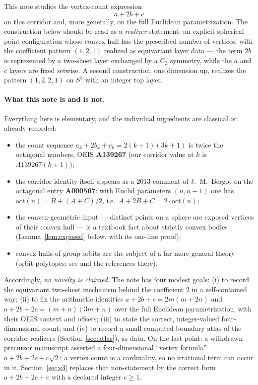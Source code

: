 \documentclass[11pt]{article}
\theoremstyle{definition}
\theoremstyle{remark}
\newcommand{\Ctwo}{C_2}
\begin{document}
This note studies the vertex-count expression
\[
a+2b+c
\]
on this corridor and, more generally, on the full Euclidean parametrization.
The construction below should be read as a \emph{realizer} statement: an
explicit spherical point configuration whose convex hull has the prescribed
number of vertices, with the coefficient pattern $(1,2,1)$ realized as
equivariant layer data --- the term $2b$ is represented by a two-sheet layer
exchanged by a $\Ctwo$ symmetry, while the $a$ and $c$ layers are fixed
setwise. A second construction, one dimension up, realizes the pattern
$(1,2,2,1)$ on $S^3$ with an integer top layer.

\paragraph{What this note is and is not.}
Everything here is elementary, and the individual ingredients are classical
or already recorded:

\begin{itemize}
\item the count sequence $a_k+2b_k+c_k = 2(k+1)(3k+1)$ is twice the
octagonal numbers, OEIS \textbf{A139267} (our corridor value at $k$ is
$A139267(k+1)$);
\item the corridor identity itself appears as a 2013 comment of
J.~M.~Bergot on the octagonal entry \textbf{A000567}: with Euclid
parameters $(n,n-1)$ one has $\mathrm{oct}(n)=B+(A+C)/2$, i.e.\
$A+2B+C = 2\cdot\mathrm{oct}(n)$;
\item the convex-geometric input --- distinct points on a sphere are
exposed vertices of their convex hull --- is a textbook fact about strictly
convex bodies (Lemma~\ref{lem:exposed} below, with its one-line proof);
\item convex hulls of group orbits are the subject of a far more general
theory (orbit polytopes; see \cite{frieseladisch} and the references
there).
\end{itemize}

Accordingly, \emph{no novelty is claimed}. The note has four modest goals:
(i) to record the equivariant two-sheet mechanism behind the coefficient
$2$ in a self-contained way; (ii) to fix the arithmetic identities
$a+2b+c=2m(m+2n)$ and $a+2b+2c=(m+n)(3m+n)$ over the full Euclidean
parametrization, with their OEIS context and offsets; (iii) to state
the correct, integer-valued four-dimensional count; and (iv) to record a
small computed boundary atlas of the corridor realizers
(Section~\ref{sec:atlas}), as data. On the last point: a
withdrawn precursor manuscript asserted a four-dimensional ``vertex
formula'' $a+2b+2c+c\sqrt2$; a vertex count is a cardinality, so no
irrational term can occur in it. Section~\ref{sec:s3} replaces that
non-statement by the correct form $a+2b+2c+e$ with a declared integer
$e\ge1$.
\end{document}
